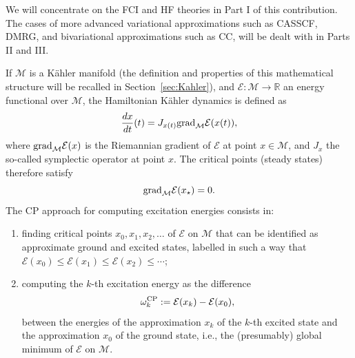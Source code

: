 \documentclass[11pt]{article}
\def\R{{\mathbb R}}
\begin{document}
\medskip

We will concentrate on the FCI and HF theories in Part I of this contribution. The cases of more advanced variational approximations such as CASSCF, DMRG, and bivariational approximations such as CC,\supercite{Cizek1980,Cizek1991,Bartlett2007} will be dealt with in Parts II and III.

\medskip

If $\mathcal M$ is a K\"ahler manifold (the definition and properties of this mathematical structure will be recalled in Section~\ref{sec:Kahler}), and $\mathcal E : \mathcal M \to \R$ an energy functional over $\mathcal M$, the Hamiltonian K\"ahler dynamics is defined as
\begin{equation}\label{eq:dynamics_0}
{\frac{dx}{dt}(t) = J_{x(t)} {\rm grad}_{\mathcal M}\mathcal E(x(t))},
\end{equation} 
where ${\rm grad}_{\mathcal M}\mathcal E(x)$ is the Riemannian gradient of $\mathcal E$ at point $x \in \mathcal M$, and  $J_x$ the so-called symplectic operator at point $x$. 
The critical points (steady states) therefore satisfy
\begin{equation} \label{eq:critical_points_0}
{{\rm grad}_{\mathcal M}\mathcal E(x_\star)=0}.
\end{equation}
The CP approach for computing excitation energies consists in:
\begin{enumerate}
    \item finding critical points $x_0, x_1, x_2,\ldots$ of $\mathcal E$ on $\mathcal M$ that can be identified as approximate ground and excited states, labelled in such a way that $\mathcal E(x_0) \le \mathcal E(x_1) \le \mathcal E(x_2)\le \cdots$;
    \item computing the $k$-th excitation energy as the difference 
    \begin{equation} \label{eq:omega_CP}
        \omega^{\rm CP}_k := \mathcal E(x_k) - \mathcal E(x_0),
    \end{equation}
    between the energies of the approximation $x_k$ of the $k$-th excited state and the approximation $x_0$ of the ground state, i.e., the (presumably) global minimum of $\mathcal E$ on $\mathcal M$.
\end{enumerate}
\end{document}
